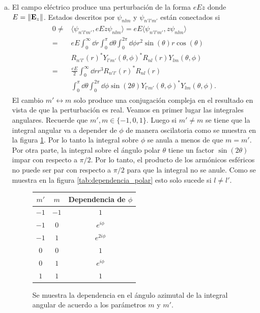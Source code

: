 \documentclass{article}
\begin{document}
\begin{enumerate}[1)]
\begin{enumerate}[a)]
\item El campo eléctrico produce una perturbación de la forma $eEz$ donde $E=\|\vb{E}_z\|$. Estados descritos por $\psi_{nlm}$ y $\psi_{n'l'm'}$ están conectados si
\begin{align}
\begin{split}
0\neq&\langle\psi_{n'l'm'},eEz\psi_{nlm}\rangle=eE\langle\psi_{n'l'm'},z\psi_{nlm}\rangle\\
=&eE\int_0^\infty\dd{r}\int_0^\pi\dd{\theta}\int_0^{2\pi}\dd{\phi}r^2\sin(\theta)r\cos(\theta)\\
&R_{n'l'}(r)^*Y_{l'm'}(\theta,\phi)^*R_{nl}(r)Y_{lm}(\theta,\phi)\\
=&\frac{eE}{2}\int_0^\infty\dd{r}r^3R_{n'l'}(r)^*R_{nl}(r)\\
&\int_0^\pi\dd{\theta}\int_0^{2\pi}\dd{\phi}\sin(2\theta)Y_{l'm'}(\theta,\phi)^*Y_{lm}(\theta,\phi).
\end{split}
\end{align}
El cambio $m'\leftrightarrow m$ solo produce una conjugación compleja en el resultado en vista de que la perturbación es real. Veamos en primer lugar las integrales angulares. Recuerde que $m',m\in\{-1,0,1\}$. Luego si $m'\neq m$ se tiene que la integral angular va a depender de $\phi$ de manera oscilatoria como se muestra en la figura \ref{tab:dependencia_azimutal}. Por lo tanto la integral sobre $\phi$ se anula a menos de que $m=m'$. Por otra parte, la integral sobre el ángulo polar $\theta$ tiene un factor $\sin(2\theta)$ impar con respecto a $\pi/2$. Por lo tanto, el producto de los armónicos esféricos no puede ser par con respecto a $\pi/2$ para que la integral no se anule. Como se muestra en la figura \ref{tab:dependencia_polar} esto solo sucede si $l\neq l'$.
\begin{figure}
\center
\begin{tabular}{|c|c|c|}
\hline
$m'$ & $m$ & Dependencia de $\phi$ \\
\hline
$-1$ & $-1$ & $1$ \\
$-1$ & $0$ & $e^{i\phi}$ \\
$-1$ & $1$ & $e^{2i\phi}$ \\
$0$ & $0$ & $1$ \\
$0$ & $1$ & $e^{i\phi}$ \\
$1$ & $1$ & $1$ \\
\hline
\end{tabular}
\caption{\label{tab:dependencia_azimutal}Se muestra la dependencia en el ángulo azimutal de la integral angular de acuerdo a los parámetros $m$ y $m'$.}
\end{figure}

\end{enumerate}
\end{enumerate}
\end{document}
